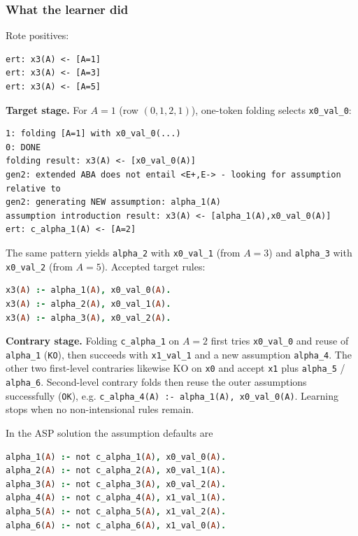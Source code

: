 \documentclass[11pt]{article}
\begin{document}
\subsubsection{What the learner did}

Rote positives:

\begin{lstlisting}[style=logic]
ert: x3(A) <- [A=1]
ert: x3(A) <- [A=3]
ert: x3(A) <- [A=5]
\end{lstlisting}

\textbf{Target stage.} For \(A=1\) (row \((0,1,2,1)\)), one-token folding selects \texttt{x0\_val\_0}:

\begin{lstlisting}[style=logic]
1: folding [A=1] with x0_val_0(...)
0: DONE
folding result: x3(A) <- [x0_val_0(A)]
gen2: extended ABA does not entail <E+,E-> - looking for assumption relative to
gen2: generating NEW assumption: alpha_1(A)
assumption introduction result: x3(A) <- [alpha_1(A),x0_val_0(A)]
ert: c_alpha_1(A) <- [A=2]
\end{lstlisting}

The same pattern yields \texttt{alpha\_2} with \texttt{x0\_val\_1} (from \(A=3\)) and \texttt{alpha\_3} with \texttt{x0\_val\_2} (from \(A=5\)). Accepted target rules:

\begin{lstlisting}[style=logic,language=Prolog]
x3(A) :- alpha_1(A), x0_val_0(A).
x3(A) :- alpha_2(A), x0_val_1(A).
x3(A) :- alpha_3(A), x0_val_2(A).
\end{lstlisting}

\textbf{Contrary stage.} Folding \texttt{c\_alpha\_1} on \(A=2\) first tries \texttt{x0\_val\_0} and reuse of \texttt{alpha\_1} (\texttt{KO}), then succeeds with \texttt{x1\_val\_1} and a new assumption \texttt{alpha\_4}. The other two first-level contraries likewise KO on \texttt{x0} and accept \texttt{x1} plus \texttt{alpha\_5} / \texttt{alpha\_6}. Second-level contrary folds then reuse the outer assumptions successfully (\texttt{OK}), e.g. \texttt{c\_alpha\_4(A) :- alpha\_1(A), x0\_val\_0(A)}. Learning stops when no non-intensional rules remain.

In the ASP solution the assumption defaults are

\begin{lstlisting}[style=logic,language=Prolog]
alpha_1(A) :- not c_alpha_1(A), x0_val_0(A).
alpha_2(A) :- not c_alpha_2(A), x0_val_1(A).
alpha_3(A) :- not c_alpha_3(A), x0_val_2(A).
alpha_4(A) :- not c_alpha_4(A), x1_val_1(A).
alpha_5(A) :- not c_alpha_5(A), x1_val_2(A).
alpha_6(A) :- not c_alpha_6(A), x1_val_0(A).
\end{lstlisting}
\end{document}
